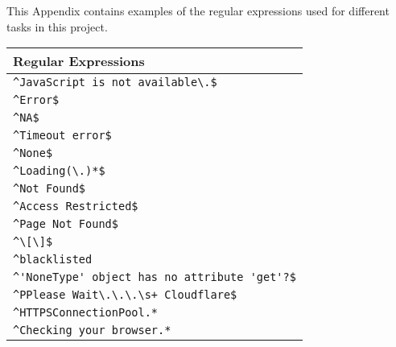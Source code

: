 \label{appendix02:regular_expressions}

This Appendix contains examples of the regular expressions used for different tasks in this project.


\label{appendix02:pesv_error_regex}

\begin{table}[ht]
\centering
\begin{tabular}{|l|}
\hline
\textbf{Regular Expressions} \\ \hline
\verb|^JavaScript is not available\.$| \\
\verb|^Error$| \\
\verb|^NA$| \\
\verb|^Timeout error$| \\
\verb|^None$| \\
\verb|^Loading(\.)*$| \\
\verb|^Not Found$| \\
\verb|^Access Restricted$| \\
\verb|^Page Not Found$| \\
\verb|^\[\]$| \\
\verb|^blacklisted| \\
\verb|^'NoneType' object has no attribute 'get'?$| \\
\verb|^PPlease Wait\.\.\.\s+ Cloudflare$| \\
\verb|^HTTPSConnectionPool.*| \\
\verb|^Checking your browser.*| \\

\end{tabular}
\end{table}
